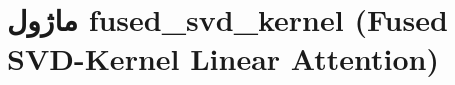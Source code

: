 \section{ماژول fused\_svd\_kernel (Fused SVD-Kernel Linear Attention)}
\label{sec:module_fused_svd_kernel}
